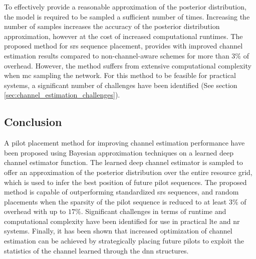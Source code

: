 To effectively provide a reasonable approximation of the posterior distribution, the model is required to be sampled a sufficient number of times. Increasing the number of samples increases the accuracy of the posterior distribution approximation, however at the cost of increased computational runtimes. The proposed method for \gls{srs} sequence placement, provides with improved channel estimation results compared to non-channel-aware schemes for more than $3\%$ of overhead. However, the method suffers from extensive computational complexity when \gls{mc} sampling the network. For this method to be feasible for practical systems, a significant number of challenges have been identified (See section \ref{sec:channel_estimation_challenges}). 

\subsection{Conclusion}
A pilot placement method for improving channel estimation performance have been proposed using Bayesian approximation techniques on a learned deep channel estimator function. The learned deep channel estimator is sampled to offer an approximation of the posterior distribution over the entire resource grid, which is used to infer the best position of future pilot sequences. The proposed method is capable of outperforming standardized \gls{srs} sequences, and random placements when the sparsity of the pilot sequence is reduced to at least $3\%$ of overhead with up to $17\%$. Significant challenges in terms of runtime and computational complexity have been identified for use in practical \gls{lte} and \gls{nr} systems. Finally, it has been shown that increased optimization of channel estimation can be achieved by strategically placing future pilots to exploit the statistics of the channel learned through the \gls{dnn} structures.

